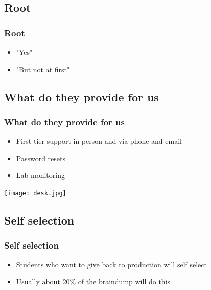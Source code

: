 \documentclass{beamer}
\begin{document}
\subsection{Root}
\frame
{
    \frametitle{Root}
    \begin{itemize}
      \item "Yes" 
      \item "But not at first" 
    \end{itemize}
}

\subsection{What do they provide for us}
\frame
{
    \frametitle{What do they provide for us}
    \begin{itemize}
      \item First tier support in person and via phone and email
      \item Password resets
      \item Lab monitoring
    \end{itemize}
}

\frame
{
        \texttt{[image: desk.jpg]}
}

\subsection{Self selection}
\frame
{
    \frametitle{Self selection}
    \begin{itemize}
      \item Students who want to give back to production will self select
      \item Usually about 20\% of the braindump will do this
    \end{itemize}
}
\end{document}
